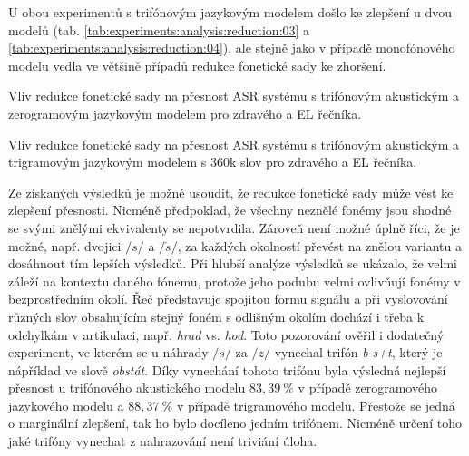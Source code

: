 U obou experimentů s trifónovým jazykovým modelem došlo ke zlepšení u dvou modelů (tab. \ref{tab:experiments:analysis:reduction:03} a \ref{tab:experiments:analysis:reduction:04}), ale stejně jako v případě monofónového modelu vedla ve většině případů redukce fonetické sady ke zhoršení.

\begin{table}[htpb]
  \centering
  \def\arraystretch{1.5}
  \caption{Vliv redukce fonetické sady na přesnost ASR systému s trifónovým akustickým a zerogramovým jazykovým modelem pro zdravého a EL řečníka.}
  \label{tab:experiments:analysis:reduction:03}
\end{table}

\begin{table}[htpb]
  \centering
  \def\arraystretch{1.5}
  \caption{Vliv redukce fonetické sady na přesnost ASR systému s trifónovým akustickým a trigramovým jazykovým modelem s 360k slov pro zdravého a EL řečníka.}
  \label{tab:experiments:analysis:reduction:04}
\end{table}

Ze získaných výsledků je možné usoudit, že redukce fonetické sady může vést ke zlepšení přesnosti. Nicméně předpoklad, že všechny neznělé fonémy jsou shodné se svými znělými ekvivalenty se nepotvrdila. Zároveň není možné úplně říci, že je možné, např. dvojici $/s/$ a $/\check{s}/$, za každých okolností převést na znělou variantu a dosáhnout tím lepších výsledků. Při hlubší analýze výsledků se ukázalo, že velmi záleží na kontextu daného fónemu, protože jeho podubu velmi ovlivňují fonémy v bezprostředním okolí. Řeč představuje spojitou formu signálu a při vyslovování různých slov obsahujícím stejný foném s odlišným okolím dochází i třeba k odchylkám v artikulaci, např. \textit{hrad} vs. \textit{hod}. Toto pozorování ověřil i dodatečný experiment, ve kterém se u náhrady $/s/$ za $/z/$ vynechal trifón \textit{b-s+t}, který je nápříklad ve slově \textit{obstát}. Díky vynechání tohoto trifónu byla výsledná nejlepší přesnost u trifónového akustického modelu $83,39\ \%$ v případě zerogramového jazykového modelu a $88,37\ \%$ v případě trigramového modelu. Přestože se jedná o marginální zlepšení, tak ho bylo docíleno jedním trifónem. Nicméně určení toho jaké trifóny vynechat z nahrazování není triviání úloha.

